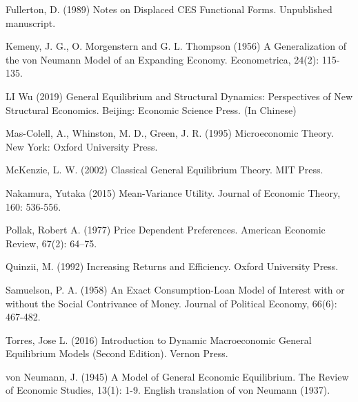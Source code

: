 \documentclass[
  letterpaper,
  DIV=11,
  numbers=noendperiod]{scrreprt}
\begin{document}
Fullerton, D. (1989) Notes on Displaced CES Functional Forms.
Unpublished manuscript.

Kemeny, J. G., O. Morgenstern and G. L. Thompson (1956) A Generalization
of the von Neumann Model of an Expanding Economy. Econometrica, 24(2):
115-135.

LI Wu (2019) General Equilibrium and Structural Dynamics: Perspectives
of New Structural Economics. Beijing: Economic Science Press. (In
Chinese)

Mas-Colell, A., Whinston, M. D., Green, J. R. (1995) Microeconomic
Theory. New York: Oxford University Press.

McKenzie, L. W. (2002) Classical General Equilibrium Theory. MIT Press.

Nakamura, Yutaka (2015) Mean-Variance Utility. Journal of Economic
Theory, 160: 536-556.

Pollak, Robert A. (1977) Price Dependent Preferences. American Economic
Review, 67(2): 64--75.

Quinzii, M. (1992) Increasing Returns and Efficiency. Oxford University
Press.

Samuelson, P. A. (1958) An Exact Consumption-Loan Model of Interest with
or without the Social Contrivance of Money. Journal of Political
Economy, 66(6): 467-482.

Torres, Jose L. (2016) Introduction to Dynamic Macroeconomic General
Equilibrium Models (Second Edition). Vernon Press.

von Neumann, J. (1945) A Model of General Economic Equilibrium. The
Review of Economic Studies, 13(1): 1-9. English translation of von
Neumann (1937).
\end{document}
